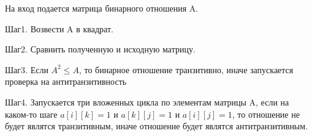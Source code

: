 \documentclass[spec, och, labwork]{shiza}
\begin{document}
\begin{enumerate}
                На вход подается матрица бинарного отношения A. 
                
                Шаг1. Возвести A в квадрат. 
                
                Шаг2. Сравнить полученную и исходную матрицу.
                
                Шаг3. Если $A^2 \leq A$, то бинарное отношение транзитивно, иначе запускается проверка на антитранзитивность
                
                Шаг4. Запускается три вложенных цикла по элементам матрицы A, если на каком-то шаге
                $a[i][k]=1$ и $a[k][j]=1$ и $a[i][j]=1$, то отношение не будет являтся транзитивным, иначе отношение будет
                являтся антитранзитивным.

            \end{enumerate}
        
\end{document}
